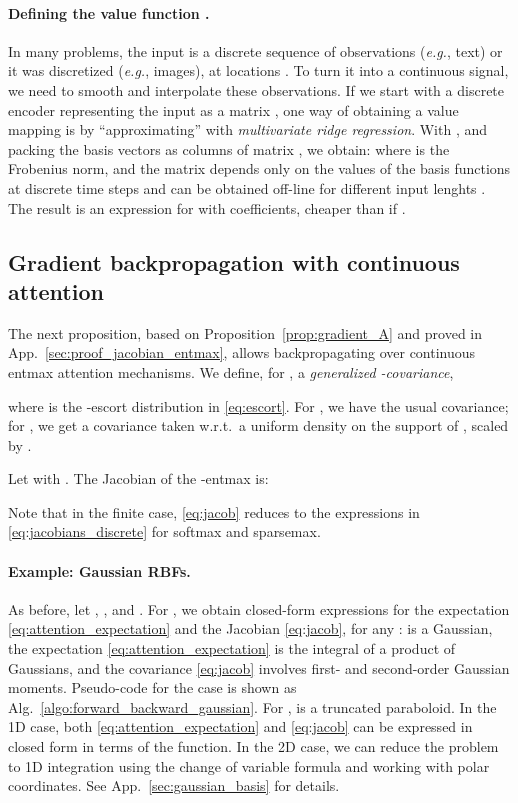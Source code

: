\documentclass{article}
\begin{document}
\paragraph{Defining the value function .}
In many problems, the input is a discrete sequence of observations (\textit{e.g.}, text) or it was discretized (\textit{e.g.}, images), at locations . To turn it into a continuous signal, we need to smooth and interpolate these observations. If we start with a  discrete encoder representing the input as a matrix , one way of obtaining a value mapping  is by ``approximating''  with {\it multivariate ridge regression}. With  , and packing the basis vectors  as columns of matrix , we obtain: 
where  is the Frobenius norm, and
the  matrix  depends only on the values of the basis functions at discrete time steps and can be obtained off-line for different input lenghts .
The result is an expression for  with  coefficients, cheaper than  if . 


\subsection{Gradient backpropagation with continuous attention}\label{sec:jacobian}


The next proposition, based on Proposition~\ref{prop:gradient_A} and proved in App.~\ref{sec:proof_jacobian_entmax}, allows backpropagating over continuous entmax attention mechanisms. We define, for , a {\it generalized -covariance},

where  is the -escort distribution in \eqref{eq:escort}.
For , we have the usual covariance; for , we get a covariance taken w.r.t.\ a uniform density on the support of ,  scaled by .


\vspace{0.1cm}
\begin{proposition}\label{prop:jacobian_entmax}
Let  with .
The Jacobian of the -entmax is:
    
\end{proposition}

Note that in the finite case, \eqref{eq:jacob} reduces to the expressions in \eqref{eq:jacobians_discrete} for softmax and sparsemax. 

\paragraph{Example: Gaussian RBFs.} 
As before, let , , and . 
For , we obtain closed-form expressions for the expectation \eqref{eq:attention_expectation} and the Jacobian \eqref{eq:jacob}, for any : 
 is a Gaussian, the expectation 
\eqref{eq:attention_expectation} is the integral of a product of Gaussians, and the covariance \eqref{eq:jacob} involves first- and second-order Gaussian moments. Pseudo-code for the case  is shown as Alg.~\ref{algo:forward_backward_gaussian}. 
For ,  is a truncated paraboloid. 
In the 1D case, both \eqref{eq:attention_expectation} and \eqref{eq:jacob} can be expressed in closed form in terms of the  function. 
In the 2D case, we can reduce the problem to 1D integration using the change of variable formula and working with polar coordinates. See App.~\ref{sec:gaussian_basis} for details. 
\end{document}
